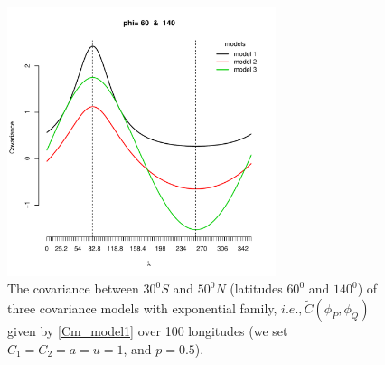 			\begin{figure}
				\centering
				\includegraphics[width=0.7\textwidth]{graphs/all_covariance_models}
				\caption[The Covariance Between $30^0S$ and $50^0N$ (Latitudes $60^0$ and $140^0$) of Three] {The covariance between $30^0S$ and $50^0N$ (latitudes $60^0$ and $140^0$) of three covariance models with exponential family, $ i.e., \tilde{C}(\phi_P, \phi_Q)$ given by \eqref{Cm_model1} over 100 longitudes (we set $C_1 = C_2 = a = u = 1$, and $p = 0.5$).}
			\end{figure}
				
					
